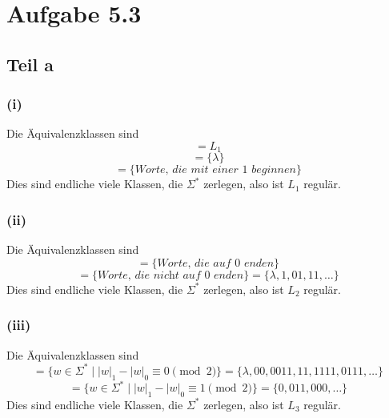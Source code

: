 \documentclass[10pt,a4paper]{article}
\begin{document}
\section{Aufgabe 5.3}

\subsection{Teil a}

\subsubsection{(i)}

Die Äquivalenzklassen sind
\begin{equation}
  [0] = L_{1}
\end{equation}
\begin{equation}
  [\lambda] = \{ \lambda \}
\end{equation}
\begin{equation}
  [1] = \{ \textit{Worte, die mit einer $1$ beginnen} \}
\end{equation}
Dies sind endliche viele Klassen, die $\Sigma^{*}$ zerlegen, also ist $L_{1}$ regulär.

\subsubsection{(ii)}

Die Äquivalenzklassen sind
\begin{equation}
  [0] = \{ \textit{Worte, die auf $0$ enden} \}
\end{equation}
\begin{equation}
  [1] = \{ \textit{Worte, die nicht auf $0$ enden} \} = \{ \lambda, 1, 01, 11, \dots \}
\end{equation}
Dies sind endliche viele Klassen, die $\Sigma^{*}$ zerlegen, also ist $L_{2}$ regulär.

\subsubsection{(iii)}

Die Äquivalenzklassen sind
\begin{equation}
  [\lambda] = \{ w \in \Sigma^{*} \mid |w|_{1} - |w|_{0} \equiv 0 \pmod 2 \} = \{ \lambda, 00, 0011, 11, 1111, 0111, \dots \}
\end{equation}
\begin{equation}
  [0] = \{ w \in \Sigma^{*} \mid |w|_{1} - |w|_{0} \equiv 1 \pmod 2 \} = \{ 0, 011, 000, \dots \}
\end{equation}
Dies sind endliche viele Klassen, die $\Sigma^{*}$ zerlegen, also ist $L_{3}$ regulär.
\end{document}
